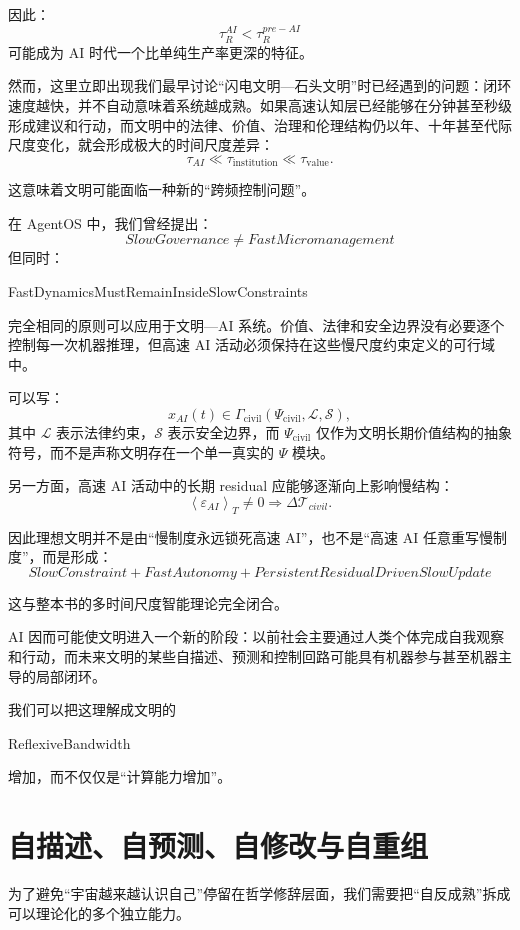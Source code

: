 因此：
\[
\boxed{
\tau_R^{AI}
<
\tau_R^{pre-AI}
}
\]
可能成为 AI 时代一个比单纯生产率更深的特征。

然而，这里立即出现我们最早讨论“闪电文明—石头文明”时已经遇到的问题：闭环速度越快，并不自动意味着系统越成熟。如果高速认知层已经能够在分钟甚至秒级形成建议和行动，而文明中的法律、价值、治理和伦理结构仍以年、十年甚至代际尺度变化，就会形成极大的时间尺度差异：
\[
\tau_{AI}
\ll
\tau_{\mathrm{institution}}
\ll
\tau_{\mathrm{value}}.
\]

这意味着文明可能面临一种新的“跨频控制问题”。

在 AgentOS 中，我们曾经提出：
\[
\boxed{
SlowGovernance\neq FastMicromanagement
}
\]
但同时：
\begin{statementbox}
FastDynamicsMustRemainInsideSlowConstraints
\end{statementbox}

完全相同的原则可以应用于文明—AI 系统。价值、法律和安全边界没有必要逐个控制每一次机器推理，但高速 AI 活动必须保持在这些慢尺度约束定义的可行域中。

可以写：
\[
x_{AI}(t)
\in
\Gamma_{\mathrm{civil}}(
\Psi_{\mathrm{civil}},
\mathcal{L},
\mathcal{S}
),
\]
其中 $\mathcal{L}$ 表示法律约束，$\mathcal{S}$ 表示安全边界，而 $\Psi_{\mathrm{civil}}$ 仅作为文明长期价值结构的抽象符号，而不是声称文明存在一个单一真实的 $\Psi$ 模块。

另一方面，高速 AI 活动中的长期 residual 应能够逐渐向上影响慢结构：
\[
\left\langle
\varepsilon_{AI}
\right\rangle_T
\neq0
\Rightarrow
\Delta\mathcal{T}_{civil}.
\]

因此理想文明并不是由“慢制度永远锁死高速 AI”，也不是“高速 AI 任意重写慢制度”，而是形成：
\[
\boxed{
SlowConstraint
+
FastAutonomy
+
PersistentResidualDrivenSlowUpdate
}
\]

这与整本书的多时间尺度智能理论完全闭合。

AI 因而可能使文明进入一个新的阶段：以前社会主要通过人类个体完成自我观察和行动，而未来文明的某些自描述、预测和控制回路可能具有机器参与甚至机器主导的局部闭环。

我们可以把这理解成文明的
\begin{statementbox}
ReflexiveBandwidth
\end{statementbox}
增加，而不仅仅是“计算能力增加”。


\section{自描述、自预测、自修改与自重组}

为了避免“宇宙越来越认识自己”停留在哲学修辞层面，我们需要把“自反成熟”拆成可以理论化的多个独立能力。


